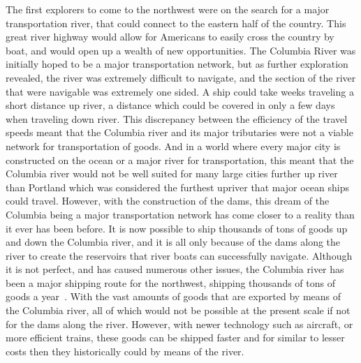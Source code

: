 \documentclass[12pt,twoside]{article}
\begin{document}
The first explorers to come to the northwest were on the search for a major transportation river, that could connect to the eastern half of the country. This great river highway would allow for Americans to easily cross the country by boat, and would open up a wealth of new opportunities. The Columbia River was initially hoped to be a major transportation network, but as further exploration revealed, the river was extremely difficult to navigate, and the section of the river that were navigable was extremely one sided. A ship could take weeks traveling a short distance up river, a distance which could be covered in only a few days when traveling down river. This discrepancy between the efficiency of the travel speeds meant that the Columbia river and its major tributaries were not a viable network for transportation of goods. And in a world where every major city is constructed on the ocean or a major river for transportation, this meant that the Columbia river would not be well suited for many large cities further up river than Portland which was considered the furthest upriver that major ocean ships could travel. However, with the construction of the dams, this dream of the Columbia being a major transportation network has come closer to a reality than it ever has been before. It is now possible to ship thousands of tons of goods up and down the Columbia river, and it is all only because of the dams along the river to create the reservoirs that river boats can successfully navigate. Although it is not perfect, and has caused numerous other issues, the Columbia river has been a major shipping route for the northwest, shipping thousands of tons of goods a year~\cite{TRM}. With the vast amounts of goods that are exported by means of the Columbia river, all of which would not be possible at the present scale if not for the dams along the river. However, with newer technology such as aircraft, or more efficient trains, these goods can be shipped faster and for similar to lesser costs then they historically could by means of the river.
\par
\end{document}
